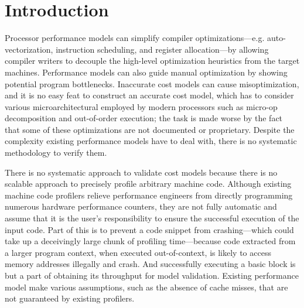 \section{Introduction}

Processor performance models can simplify compiler optimizations---e.g.
auto-vectorization, instruction scheduling, and register allocation---by
allowing compiler writers to decouple the high-level optimization
heuristics from the target machines.
Performance models can also guide manual optimization by showing
potential program bottlenecks.
Inaccurate cost models can cause misoptimization,
and it is no easy feat to construct an accurate cost model,
which has to consider various microarchitectural employed by
modern processors such as micro-op decomposition and out-of-order execution;
the task is made worse by the fact that some of these optimizations 
are not documented or proprietary.
Despite the complexity existing performance models have to deal with,
there is no systematic methodology to verify them.

There is no systematic approach to validate cost models because there 
is no scalable approach to precisely profile arbitrary machine code.
Although existing machine code profilers relieve performance engineers
from directly programming numerous hardware performance counters, 
they are not fully automatic and
assume that it is the user's responsibility to ensure
the successful execution of the input code.
Part of this is to prevent a code snippet from crashing---which
could take up a deceivingly large chunk of profiling time---because 
code extracted from a larger program context, when executed
out-of-context, is likely to access memory addresses illegally and crash.
And successfully executing a basic block is but a part of obtaining
its throughput for model validation.
Existing performance model make various assumptions, such as the absence of
cache misses, that are not guaranteed by existing profilers.

